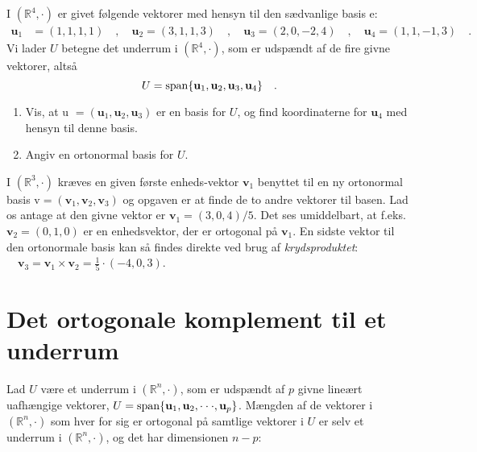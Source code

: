 \begin{exercise} \label{exercLA10.39}
I $(\mathbb{R}^{4}, \bm{\cdot})$ er givet følgende vektorer med hensyn til den sædvanlige basis e:
\begin{equation*}
\begin{aligned}
\mathbf{u}_{1} &= {(1,1,1,1)} \quad , \quad \mathbf{u}_{2} = {(3,1,1,3)} \quad , \quad \mathbf{u}_{3} = {(2,0,-2,4)} \quad , \quad \mathbf{u}_{4} = {(1,1,-1,3)} \quad .
\end{aligned}
\end{equation*}
Vi lader $U$ betegne det underrum i $(\mathbb{R}^{4}, {\bm{\cdot}})$, som er udspændt af de fire givne vektorer, altså
\begin{equation}
U = \mathrm{span}\{\mathbf{u}_{1}, \mathbf{u}_{2}, \mathbf{u}_{3}, \mathbf{u}_{4}\} \quad .
\end{equation}
\begin{enumerate}
\item Vis, at u $ = ( \mathbf{u}_{1}, \mathbf{u}_{2}, \mathbf{u}_{3}) $ er en basis for $U$, og find koordinaterne for $\mathbf{u}_{4}$ med hensyn til denne basis.
\item Angiv en ortonormal basis for $U$.
\end{enumerate}
\end{exercise}


\begin{example} \label{exampOrto3D}
I $(\mathbb{R}^{3}, \bm{\cdot})$ kræves en given første enheds-vektor $\mathbf{v}_{1}$ benyttet til en ny ortonormal basis
v$= ( \mathbf{v}_{1}, \mathbf{v}_{2}, \mathbf{v}_{3})$ og opgaven er at finde de to andre vektorer til basen. Lad os antage at den givne vektor er $ \mathbf{v}_{1} = (3,0,4)/5$. Det ses umiddelbart, at f.eks.  $\mathbf{v}_{2} = (0, 1,0)$ er en enhedsvektor, der er ortogonal på $\mathbf{v}_{1}$. En sidste vektor til den ortonormale basis kan så findes direkte ved brug af \emph{krydsproduktet}: $\quad \mathbf{v}_{3} = \mathbf{v}_{1} \times \mathbf{v}_{2} = \frac{1}{5}\cdot(-4, 0, 3)$.
\end{example}


\section{Det ortogonale komplement til et underrum}
Lad  $U$ være et underrum  i $(\mathbb{R}^{n}, \bm{\cdot})$, som er udspændt af $p$ givne lineært uafhængige vektorer, $U = \mathrm{span}\{\mathbf{u}_{1}, \mathbf{u}_{2}, \cdot \cdot \cdot , \mathbf{u}_{p}\}$. Mængden af de vektorer i $(\mathbb{R}^{n}, \bm{\cdot})$ som hver for sig er ortogonal på samtlige vektorer i $U$ er selv et underrum i $(\mathbb{R}^{n}, \bm{\cdot})$, og det har dimensionen $n-p$:

